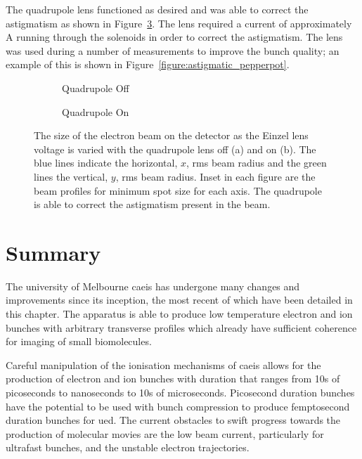 The quadrupole lens functioned as desired and was able to correct the astigmatism as shown in Figure~\ref{figure:quadrupole_scans}.
The lens required a current of approximately \unit[1]{A} running through the solenoids in order to correct the astigmatism.
The lens was used during a number of measurements to improve the bunch quality; an example of this is shown in Figure~\ref{figure:astigmatic_pepperpot}. 

\begin{figure}
    \centering
    \begin{subfigure}{0.49\linewidth}
    \centering
    
    \caption{Quadrupole Off}
    \label{figure:quadrupole_scans_off}
    \end{subfigure}
    \begin{subfigure}{0.49\linewidth}
    \centering
    
    \caption{Quadrupole On}
    \label{figure:quadrupole_scans_on}
    \end{subfigure}
    \caption[Astigmatism correction.]{The size of the electron beam on the detector as the Einzel lens voltage is varied with the quadrupole lens off (a) and on (b). The blue lines indicate the horizontal, $x$, \gls{rms} beam radius and the green lines the vertical, $y$, \gls{rms} beam radius. Inset in each figure are the beam profiles for minimum spot size for each axis. The quadrupole is able to correct the astigmatism present in the beam.}
    \label{figure:quadrupole_scans}
\end{figure}

\section{Summary}

The university of Melbourne \gls{caeis} has undergone many changes and improvements since its inception, the most recent of which have been detailed in this chapter.
The apparatus is able to produce low temperature electron and ion bunches with arbitrary transverse profiles which already have sufficient coherence for imaging of small biomolecules.

Careful manipulation of the ionisation mechanisms of \gls{caeis} allows for the production of electron and ion bunches with duration that ranges from 10s of picoseconds to nanoseconds to 10s of microseconds.
Picosecond duration bunches have the potential to be used with bunch compression to produce femptosecond duration bunches for \gls{ued}.
The current obstacles to swift progress towards the production of molecular movies are the low beam current, particularly for ultrafast bunches, and the unstable electron trajectories.


